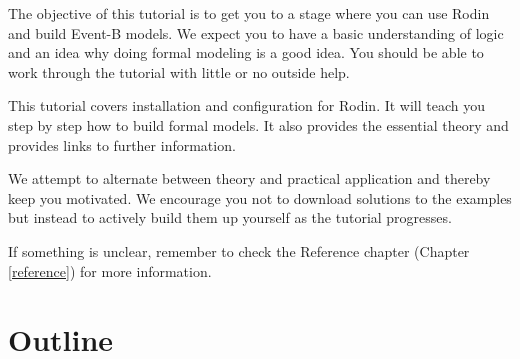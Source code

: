 
The objective of this tutorial is to get you to a stage where you can use Rodin and build Event-B models.  We expect you to have a basic understanding of logic and an idea why doing formal modeling is a good idea.  You should be able to work through the tutorial with little or no outside help.

This tutorial covers installation and configuration for Rodin. It will teach you step by step how to build formal models. It also provides the essential theory and provides links to further information.

We attempt to alternate between theory and practical application and thereby keep you motivated.  We encourage you not to download solutions to the examples but instead to actively build them up yourself as the tutorial progresses.

If something is unclear, remember to check the Reference chapter (Chapter \ref{reference}) for more information.

\section{Outline}
\label{tut_outline}

